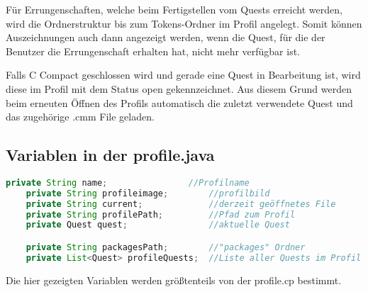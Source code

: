 Für Errungenschaften, welche beim Fertigstellen vom Quests erreicht werden, wird die Ordnerstruktur bis zum Tokens-Ordner im Profil angelegt. Somit können Auszeichnungen auch dann angezeigt werden, wenn die Quest, für die der Benutzer die Errungenschaft erhalten hat, nicht mehr verfügbar ist.

Falls C Compact geschlossen wird und gerade eine Quest in Bearbeitung ist, wird diese im Profil mit dem Status open gekennzeichnet. Aus diesem Grund werden beim erneuten Öffnen des Profils automatisch die zuletzt verwendete Quest und das zugehörige .cmm File geladen.

\subsection{Variablen in der profile.java}
\begin{lstlisting}[language=JAVA]
	private String name;				//Profilname				
	private String profileimage;		//profilbild
	private String current;				//derzeit geöffnetes File
	private String profilePath;			//Pfad zum Profil
	private Quest quest;				//aktuelle Quest

	private String packagesPath;		//"packages" Ordner
	private List<Quest> profileQuests;	//Liste aller Quests im Profil
\end{lstlisting}
Die hier gezeigten Variablen werden größtenteils von der profile.cp bestimmt. 
